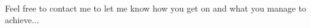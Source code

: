 \documentclass[10pt, a4paper, oneside]{article}
\begin{document}
\paragraph{} Feel free to contact me to let me know how you get on and what you manage to achieve...





\end{document}
